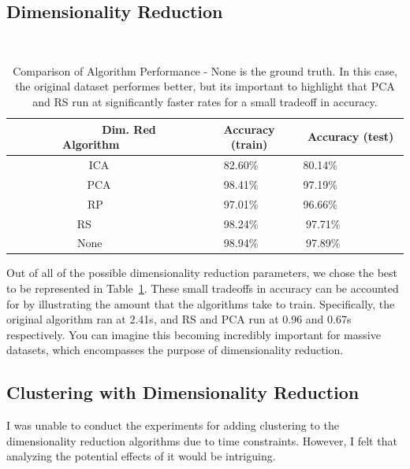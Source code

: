 \documentclass[annual]{acmsiggraph}
\begin{document}
\subsection{Dimensionality Reduction}

\begin{table}
    \begin{tabular}{|c|c|c|}
  \hline
        Dim. Red Algorithm    & Accuracy (train)   & Accuracy (test)   \\ \hline
        ICA                   & 82.60\%            & 80.14\%           \\ 
        PCA                   & 98.41\%            & 97.19\%           \\ 
        RP                    & 97.01\%            & 96.66\%           \\ 
        RS                    & 98.24\%            & 97.71\%           \\
        None                  & 98.94\%            & 97.89\%           \\

  \hline \end{tabular}
  \caption {Comparison of Algorithm Performance - None is the ground truth. In this case, the original dataset performes better, but its important to highlight that PCA and RS run at significantly faster rates for a small tradeoff in accuracy.} \label{tb:perfdesc}
  \label{tb:perf}
\end{table}
Out of all of the possible dimensionality reduction parameters, we chose the best to be represented in Table~\ref{tb:perf}. These small tradeoffs in accuracy can be accounted for by illustrating the amount that the algorithms take to train. Specifically, the original algorithm ran at 2.41s, and RS and PCA run at 0.96 and 0.67s respectively. You can imagine this becoming incredibly important for massive datasets, which encompasses the purpose of dimensionality reduction. 
\subsection{Clustering with Dimensionality Reduction}
I was unable to conduct the experiments for adding clustering to the dimensionality reduction algorithms due to time constraints. However, I felt that analyzing the potential effects of it would be intriguing. 
\end{document}
